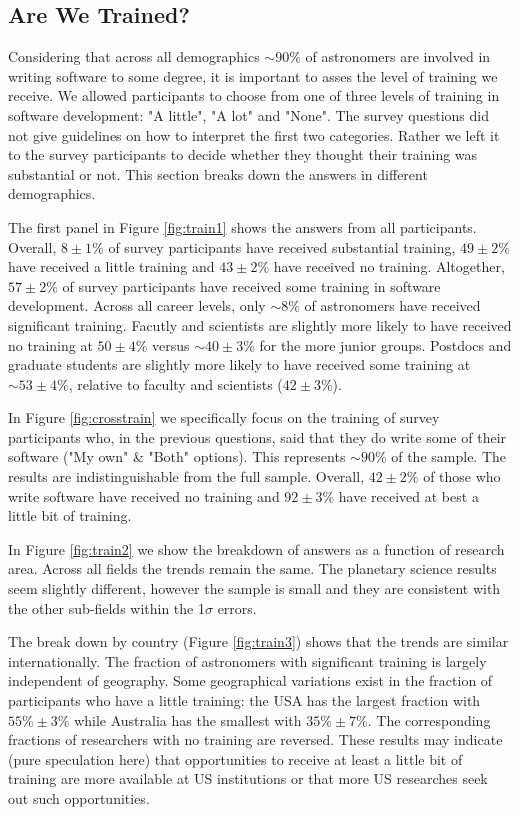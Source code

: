 \subsection{Are We Trained?}

Considering that across all demographics $\sim90\%$ of astronomers are involved in writing software to some degree, it is important to asses the level of training we receive. We allowed participants to choose from one of three levels of training in software development: "A little", "A lot" and "None". The survey questions did not give guidelines on how to interpret the first two categories. Rather we left it to the survey participants to decide whether they thought their training was substantial or not. This section breaks down the answers in different demographics. 

The first panel in Figure \ref{fig:train1} shows the answers from all participants. Overall, $8\pm1\%$ of survey participants have received substantial training, $49\pm2\%$ have received a little training and $43\pm2\%$ have received no training. Altogether, $57\pm2\%$ of survey participants have received some training in software development. Across all career levels, only $\sim8\%$ of astronomers have received significant training. Facutly and scientists are slightly more likely to have received no training at $50\pm4\%$ versus $\sim40\pm3\%$ for the more junior groups. Postdocs and graduate students are slightly more likely to have received some training at $\sim53\pm4\%$, relative to faculty and scientists ($42\pm3\%$).

In Figure \ref{fig:crosstrain} we specifically focus on the training of survey participants who, in the previous questions, said that they do write some of their software ("My own" & "Both" options). This represents $\sim90\%$ of the sample. The results are indistinguishable from the full sample. Overall, $42\pm2\%$ of those who write software have received no training and $92\pm3\%$ have received at best a little bit of training.

In Figure \ref{fig:train2} we show the breakdown of answers as a function of research area. Across all fields the trends remain the same. The planetary science results seem slightly different, however the sample is small and they are consistent with the other sub-fields within the 1$\sigma$ errors. 

The break down by country (Figure \ref{fig:train3}) shows that the trends are similar internationally. The fraction of astronomers with significant training is largely independent of geography. Some geographical variations exist in the fraction of participants who have a little training: the USA has the largest fraction with $55\%\pm3\%$ while Australia has the smallest with $35\%\pm7\%$. The corresponding fractions of researchers with no training are reversed. These results may indicate (pure speculation here) that opportunities to receive at least a little bit of training are more available at US institutions or that more US researches seek out such opportunities. 

